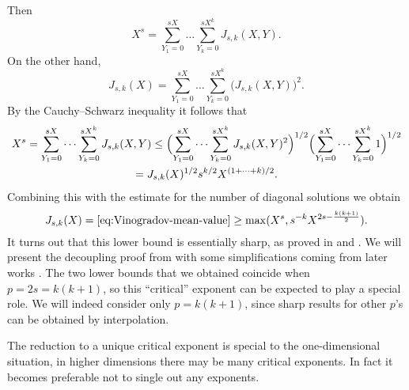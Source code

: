 Then
\[
X^{s} = \sum_{Y_{1}=0}^{sX} \dots \sum_{Y_{k}=0}^{sX^{k}} J_{s,k}(X,Y).
\]
On the other hand,
\[
J_{s,k}(X) = \sum_{Y_{1}=0}^{sX} \dots \sum_{Y_{k}=0}^{sX^{k}} \bigl( J_{s,k}(X,Y) \bigr)^{2}.
\]
By the Cauchy--Schwarz inequality it follows that
\begin{multline*}
X^{s}
=
\sum_{Y_{1}=0}^{sX} \dots \sum_{Y_{k}=0}^{sX^{k}} J_{s,k}(X,Y)
\leq
\Bigl( \sum_{Y_{1}=0}^{sX} \dots \sum_{Y_{k}=0}^{sX^{k}} J_{s,k}(X,Y)^{2} \Bigr)^{1/2}
\Bigl( \sum_{Y_{1}=0}^{sX} \dots \sum_{Y_{k}=0}^{sX^{k}} 1 \Bigr)^{1/2}
\\ =
J_{s,k}(X)^{1/2} s^{k/2} X^{(1+\dotsb+k)/2}.
\end{multline*}
Combining this with the estimate for the number of diagonal solutions we obtain
\[
J_{s,k}(X) = \eqref{eq:Vinogradov-mean-value}
\geq \max (X^{s}, s^{-k} X^{2s - \frac{k(k+1)}{2}}).
\]
It turns out that this lower bound is essentially sharp, as proved in \cite{MR3548534} and \cite{MR3938716}.
We will present the decoupling proof from \cite{MR3548534} with some simplifications coming from later works \cite{MR3709122,MR3994585,MR4031117,arxiv:1902.03450}.
The two lower bounds that we obtained coincide when $p=2s=k(k+1)$, so this ``critical'' exponent can be expected to play a special role.
We will indeed consider only $p=k(k+1)$, since sharp results for other $p$'s can be obtained by interpolation.
\begin{remark}
The reduction to a unique critical exponent is special to the one-dimensional situation, in higher dimensions there may be many critical exponents.
In fact it becomes preferable not to single out any exponents.
\end{remark}


